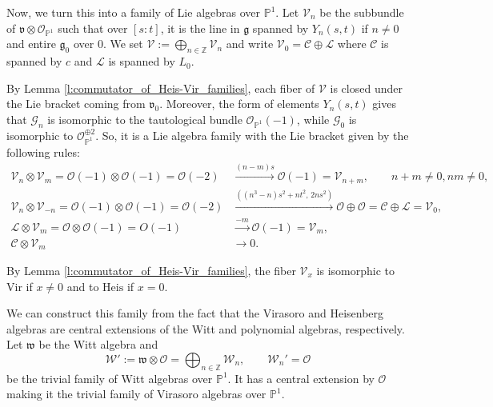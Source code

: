 \documentclass[11pt]{amsart}
\newcommand{\mc}{\mathcal}
\newcommand{\C}{\mathbb{C}}
\newcommand{\Z}{\mathbb{Z}}
\newcommand{\PP}{\mathbb{P}}
\newcommand{\g}{\mathfrak{g}}
\newcommand{\Vir}{\mathrm{Vir}}
\newcommand{\Heis}{\mathrm{Heis}}
\numberwithin{equation}{section}
\theoremstyle{plain}
\theoremstyle{definition}
\begin{document}




Now, we turn this into a family of Lie algebras over $\PP^1$. Let $\mc V_n$ be the subbundle of $\mathfrak{v}\otimes \mc O_{\PP^1}$ such that over $[s:t]$, it is the line in $\g$ spanned by $Y_n(s,t)$ if $n\ne 0$ and entire $\g_0$ over $0$. We set $\mc V:=\bigoplus_{n\in\Z}\mc V_n$ and write $\mc V_0=\mc C\oplus\mc L$ where $\mc C$ is spanned by $c$ and $\mc L$ is spanned by $L_0$.

By Lemma \ref{l:commutator_of_Heis-Vir_families}, each fiber of $\mc V$ is closed under the Lie bracket coming from $\mathfrak{v}_0$. Moreover, the form of elements $Y_n(s,t)$ gives that $\mc G_n$ is isomorphic to the tautological bundle $\mc O_{\PP^1}(-1)$, while $\mc G_0$ is isomorphic to $\mc O_{\PP^1}^{\oplus 2}$. So, it is a Lie algebra family with the Lie bracket given by the following rules:
\begin{align*}
    \mc V_n\otimes \mc V_m=\mc O(-1)\otimes \mc O(-1)=\mc O(-2)&\xrightarrow{(n-m)s}\mc O(-1)=\mc V_{n+m},\qquad n+m\ne 0,nm\ne 0,\\
    \mc V_n\otimes \mc V_{-n}=\mc O(-1)\otimes \mc O(-1)=\mc O(-2)&\xrightarrow{((n^3-n)s^2+nt^2,\,2ns^2)}\mc O\oplus\mc O=\mc C\oplus\mc L=\mc V_{0},\\
    \mc L\otimes \mc V_m=\mc O\otimes \mc O(-1)=O(-1)&\xrightarrow{-m}\mc O(-1)=\mc V_m,\\
    \mc C\otimes \mc V_m&\to 0.
\end{align*}

By Lemma \ref{l:commutator_of_Heis-Vir_families}, the fiber $\mc V_{x}$ is isomorphic to $\Vir$ if $x\ne 0$ and to $\Heis$ if $x=0$.


We can construct this family from the fact that the Virasoro and Heisenberg algebras are central extensions of the Witt and polynomial algebras, respectively. Let $\mathfrak{w}$ be the Witt algebra and
$$
\mc W':=\mathfrak{w}\otimes \mc O=\bigoplus_{n\in\Z} \mc W_n,\qquad \mc W_n'=\mc O
$$ 
be the trivial family of Witt algebras over $\PP^1$. It has a central extension by $\mc O$ making it the trivial family of Virasoro algebras over $\PP^1$.
\end{document}
